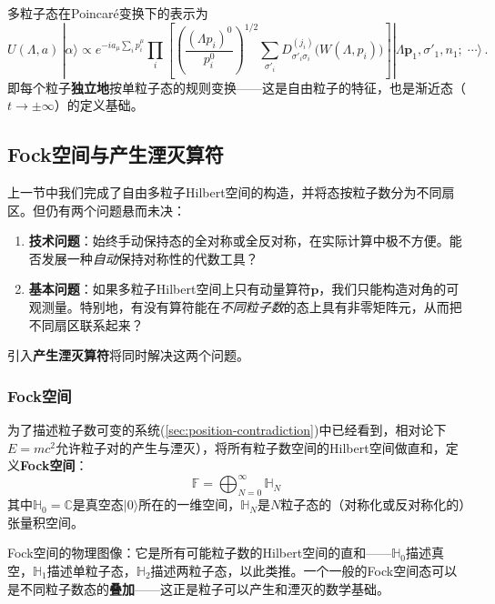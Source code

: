 多粒子态在Poincar\'e变换下的表示为
\begin{equation}\label{eq:multiPoincare}
U(\Lambda,a)\,|\alpha\rangle
\propto  e^{-ia_\mu\sum_i p_i^\mu}
\prod_i\!\left[\left(\frac{(\Lambda p_i)^0}{p_i^0}\right)^{\!1/2}
\sum_{\sigma'_i}D^{(j_i)}_{\sigma'_i\sigma_i}\!\big(W(\Lambda,p_i)\big)\right]
|\Lambda\boldsymbol{p}_1,\sigma'_1,n_1;\;\cdots\rangle\,.
\end{equation}
即每个粒子\textbf{独立地}按单粒子态的规则变换——这是自由粒子的特征，也是渐近态（$t\to\pm\infty$）的定义基础。

\subsection{Fock空间与产生湮灭算符}\label{sec:fock}

上一节中我们完成了自由多粒子Hilbert空间的构造，并将态按粒子数分为不同扇区。但仍有两个问题悬而未决：
\begin{enumerate}
    \item \textbf{技术问题}：始终手动保持态的全对称或全反对称，在实际计算中极不方便。能否发展一种\emph{自动}保持对称性的代数工具？
    \item \textbf{基本问题}：如果多粒子Hilbert空间上只有动量算符$\boldsymbol{p}$，我们只能构造对角的可观测量。特别地，有没有算符能在\emph{不同粒子数}的态上具有非零矩阵元，从而把不同扇区联系起来？
\end{enumerate}
引入\textbf{产生湮灭算符}将同时解决这两个问题。

\subsubsection*{Fock空间}

为了描述粒子数可变的系统(\ref{sec:position-contradiction})中已经看到，相对论下$E=mc^2$允许粒子对的产生与湮灭），将所有粒子数空间的Hilbert空间做直和，定义\textbf{Fock空间}：
\begin{equation}\label{eq:fock-space}
\boxed{\mathbb{F} = \bigoplus_{N=0}^{\infty} \mathbb{H}_N}
\end{equation}
其中$\mathbb{H}_0 = \mathbb{C}$是真空态$|0\rangle$所在的一维空间，$\mathbb{H}_N$是$N$粒子态的（对称化或反对称化的）张量积空间。

Fock空间的物理图像：它是所有可能粒子数的Hilbert空间的直和——$\mathbb{H}_0$描述真空，$\mathbb{H}_1$描述单粒子态，$\mathbb{H}_2$描述两粒子态，以此类推。一个一般的Fock空间态可以是不同粒子数态的\textbf{叠加}——这正是粒子可以产生和湮灭的数学基础。

